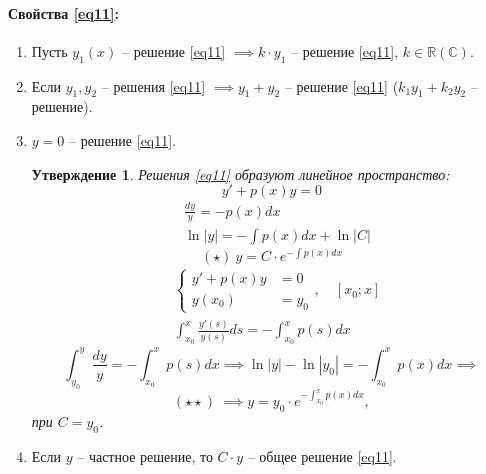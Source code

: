 \documentclass[11pt,a4paper,oneside]{report}
\theoremstyle{definition}
\theoremstyle{plain}
\newtheorem{statement}{Утверждение}[section]
\theoremstyle{remark}
\begin{document}
\paragraph*{Свойства \ref{eq11}:}
\begin{enumerate}
    \item Пусть $y_1(x)$ -- решение \ref{eq11} $\implies k\cdot y_1$ -- решение \ref{eq11}, $k \in \mathbb{R}(\mathbb{C})$.
    \item Если $y_1,y_2$ -- решения \ref{eq11} $\implies y_1 + y_2$ -- решение \ref{eq11} ($k_1y_1 + k_2y_2$ -- решение).
    \item $y=0$ -- решение \ref{eq11}.
          \begin{statement}
              Решения \ref{eq11} образуют линейное пространство:
              \begin{equation*}
                  y' + p(x)y = 0
              \end{equation*}
              \begin{align*}
                   & \frac{dy}{y} = -p(x)dx         \\
                   & \ln|y| = -\int p(x)dx + \ln|C|
              \end{align*}
              \begin{equation*}
                  (\star) \ y = C \cdot e^{-\int p(x)dx}
              \end{equation*}
              \begin{align*}
                   & \left\{\begin{array}{rl}
                                y' + p(x)y & = 0   \\
                                y(x_0)     & = y_0
                            \end{array}\right., \quad [x_0;x]                   \\
                   & \int_{x_0}^{x}\frac{y'(s)}{y(s)}ds = -\int_{x_0}^{x}p(s)dx
              \end{align*}
              \begin{equation*}
                  \int_{y_0}^{y}\frac{dy}{y} = -\int_{x_0}^{x}p(s)dx \implies \ln|y| - \ln|y_0| = - \int_{x_0}^{x}p(x)dx \implies
              \end{equation*}
              \begin{equation*}
                  (\star\star) \ \implies y = y_0\cdot e^{-\int_{x_0}^{x}p(x)dx},
              \end{equation*}
              при $C = y_0$.
          \end{statement}
    \item Если $y$ -- частное решение, то $C \cdot y$ -- общее решение \ref{eq11}.
\end{enumerate}
\end{document}
